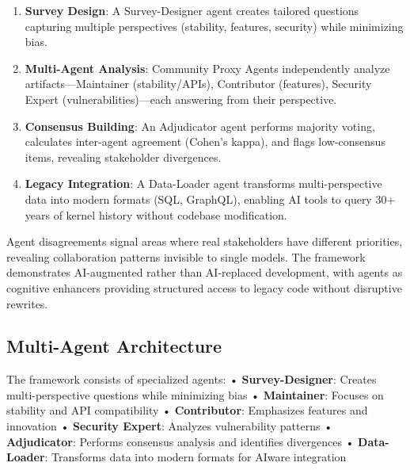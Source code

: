 \begin{enumerate}
    \item \textbf{Survey Design}: A Survey-Designer agent creates tailored questions capturing multiple perspectives (stability, features, security) while minimizing bias.

    \item \textbf{Multi-Agent Analysis}: Community Proxy Agents independently analyze artifacts—Maintainer (stability/APIs), Contributor (features), Security Expert (vulnerabilities)—each answering from their perspective.

    \item \textbf{Consensus Building}: An Adjudicator agent performs majority voting, calculates inter-agent agreement (Cohen's kappa), and flags low-consensus items, revealing stakeholder divergences.

    \item \textbf{Legacy Integration}: A Data-Loader agent transforms multi-perspective data into modern formats (SQL, GraphQL), enabling AI tools to query 30+ years of kernel history without codebase modification.

\end{enumerate}

Agent disagreements signal areas where real stakeholders have different priorities, revealing collaboration patterns invisible to single models. The framework demonstrates AI-augmented rather than AI-replaced development, with agents as cognitive enhancers providing structured access to legacy code without disruptive rewrites.

\subsection{Multi-Agent Architecture}

The framework consists of specialized agents:
• \textbf{Survey-Designer}: Creates multi-perspective questions while minimizing bias
• \textbf{Maintainer}: Focuses on stability and API compatibility
• \textbf{Contributor}: Emphasizes features and innovation
• \textbf{Security Expert}: Analyzes vulnerability patterns
• \textbf{Adjudicator}: Performs consensus analysis and identifies divergences
• \textbf{Data-Loader}: Transforms data into modern formats for AIware integration


